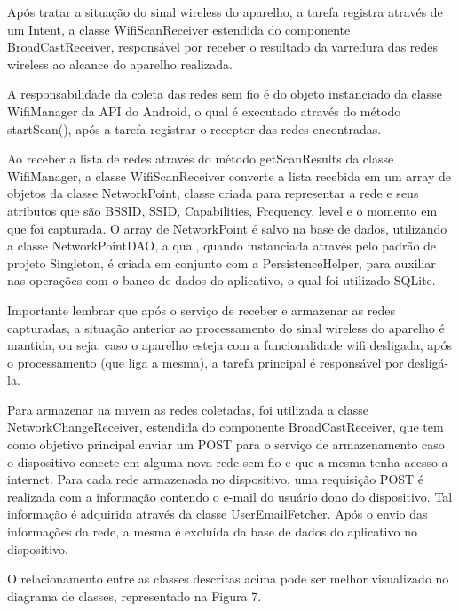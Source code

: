\documentclass[12pt, %
openright, 
oneside,
a4paper,
brazil]{facom-ufu-abntex2}
\begin{document}
  Após tratar a situação do sinal wireless do aparelho, a tarefa registra através de um Intent, a classe WifiScanReceiver estendida do componente BroadCastReceiver, responsável por receber o resultado da varredura das redes wireless ao alcance do aparelho realizada.
 
 A responsabilidade da coleta das redes sem fio é do objeto instanciado da classe WifiManager da API do Android, o qual é executado através do método startScan(), após a tarefa registrar o receptor das redes encontradas.
 
  Ao receber a lista de redes através do método getScanResults da classe WifiManager, a classe WifiScanReceiver converte a lista recebida em um array de objetos da classe NetworkPoint, classe criada para representar a rede e seus atributos que são BSSID, SSID, Capabilities, Frequency, level e o momento em que foi capturada. O array de NetworkPoint é salvo na base de dados, utilizando a classe NetworkPointDAO, a qual, quando instanciada através pelo padrão de projeto Singleton, é criada em conjunto com a PersistenceHelper, para auxiliar nas operações com o banco de dados do aplicativo, o qual foi utilizado SQLite.
 
 Importante lembrar que após o serviço de receber e armazenar as redes capturadas, a situação anterior ao processamento do sinal wireless do aparelho é mantida, ou seja, caso o aparelho esteja com a funcionalidade wifi desligada, após o processamento (que liga a mesma), a tarefa principal é responsável por desligá-la. 
 
  Para armazenar na nuvem as redes coletadas, foi utilizada a classe NetworkChangeReceiver, estendida do componente BroadCastReceiver, que tem como objetivo principal enviar um POST para o serviço de armazenamento caso o dispositivo conecte em alguma nova rede sem fio e que a mesma tenha acesso a internet. Para cada rede armazenada no dispositivo, uma requisição POST é realizada com a informação contendo o e-mail do usuário dono do dispositivo. Tal informação é adquirida através da classe UserEmailFetcher.  Após o envio das informações da rede, a mesma é excluída da base de dados do aplicativo no dispositivo.

  O relacionamento entre as classes descritas acima pode ser melhor visualizado no diagrama de classes, representado na Figura 7. 
  
\end{document}
